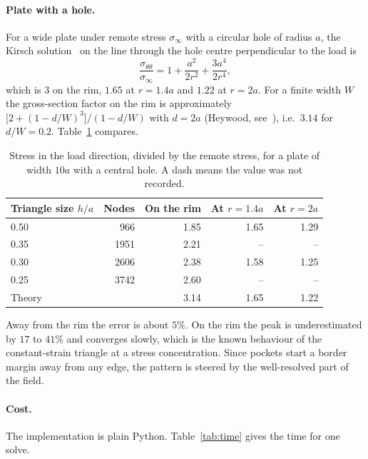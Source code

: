 \documentclass[11pt,a4paper]{article}
\begin{document}
\paragraph{Plate with a hole.} For a wide plate under remote stress
$\sigma_\infty$ with a circular hole of radius $a$, the Kirsch
solution~\cite{timoshenko} on
the line through the hole centre perpendicular to the load is
\begin{equation}
  \frac{\sigma_{\theta\theta}}{\sigma_\infty}
  = 1 + \frac{a^2}{2r^2} + \frac{3a^4}{2r^4},
\end{equation}
which is $3$ on the rim, $1.65$ at $r=1.4a$ and $1.22$ at $r=2a$. For a
finite width $W$ the gross-section factor on the rim is approximately
$\bigl[2+(1-d/W)^3\bigr]/(1-d/W)$ with $d=2a$ (Heywood, see~\cite{pilkey}), i.e.\ $3.14$ for
$d/W=0.2$. Table~\ref{tab:hole} compares.

\begin{table}[ht]
  \centering
  \begin{tabular}{lrrrr}
    \toprule
    Triangle size $h/a$ & Nodes & On the rim & At $r=1.4a$ & At $r=2a$\\
    \midrule
    0.50 & 966 & 1.85 & 1.65 & 1.29\\
    0.35 & 1951 & 2.21 & -- & --\\
    0.30 & 2606 & 2.38 & 1.58 & 1.25\\
    0.25 & 3742 & 2.60 & -- & --\\
    \midrule
    Theory & & 3.14 & 1.65 & 1.22\\
    \bottomrule
  \end{tabular}
  \caption{Stress in the load direction, divided by the remote stress, for a
           plate of width $10a$ with a central hole. A dash means the value
           was not recorded.}
  \label{tab:hole}
\end{table}

Away from the rim the error is about $5\%$. On the rim the peak is
underestimated by $17$ to $41\%$ and converges slowly, which is the known
behaviour of the constant-strain triangle at a stress concentration. Since
pockets start a border margin away from any edge, the pattern is steered by
the well-resolved part of the field.

\paragraph{Cost.} The implementation is plain Python.
Table~\ref{tab:time} gives the time for one solve.
\end{document}

